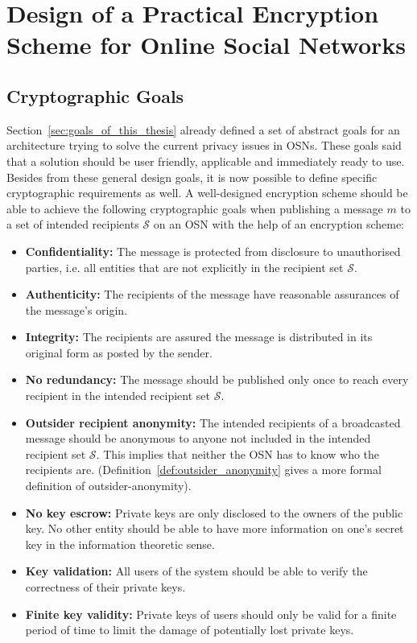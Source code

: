 \chapter{Design of a Practical Encryption Scheme for Online Social Networks}
\label{cha:n}


\section{Cryptographic Goals}
\label{sec:cryptographic_goals}
Section~\ref{sec:goals_of_this_thesis} already defined a set of abstract goals for an architecture trying to solve the current privacy issues in OSNs. These goals said that a solution should be user friendly, applicable and immediately ready to use. Besides from these general design goals, it is now possible to define specific cryptographic requirements as well. A well-designed encryption scheme should be able to achieve the following cryptographic goals when publishing a message $m$ to a set of intended recipients $\mathcal{S}$ on an OSN with the help of an encryption scheme:
\begin{itemize}
 \item \textbf{Confidentiality:} The message is protected from disclosure to unauthorised parties, i.e. all entities that are not explicitly in the recipient set $\mathcal{S}$.
 \item \textbf{Authenticity:} The recipients of the message have reasonable assurances of the message's origin.
 \item \textbf{Integrity:} The recipients are assured the message is distributed in its original form as posted by the sender.
 \item \textbf{No redundancy:} The message should be published only once to reach every recipient in the intended recipient set $\mathcal{S}$.
 \item \textbf{Outsider recipient anonymity:} The intended recipients of a broadcasted message should be anonymous to anyone not included in the intended recipient set $\mathcal{S}$. This implies that neither the OSN has to know who the recipients are. (Definition~\ref{def:outsider_anonymity} gives a more formal definition of outsider-anonymity).
 \item \textbf{No key escrow:} Private keys are only disclosed to the owners of the public key. No other entity should be able to have more information on one's secret key in the information theoretic sense.
 \item \textbf{Key validation:} All users of the system should be able to verify the correctness of their private keys.
 \item \textbf{Finite key validity:} Private keys of users should only be valid for a finite period of time to limit the damage of potentially lost private keys.
\end{itemize}

